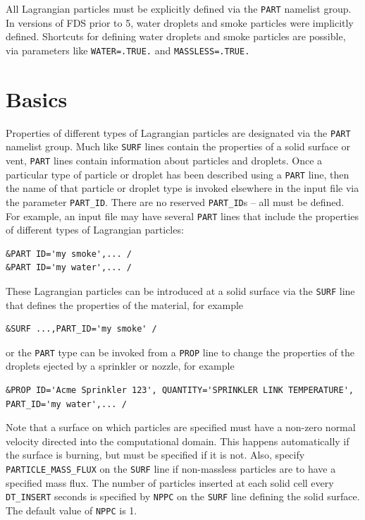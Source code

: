 \documentclass[11pt]{book}
\newcommand{\ct}{\tt\small}
\begin{document}
\begin{warning}
All Lagrangian particles must be explicitly defined via the {\ct PART} namelist group. In versions of FDS prior to 5, water droplets and
smoke particles were implicitly defined. Shortcuts for defining water droplets and smoke particles are possible, via parameters like
{\ct WATER=.TRUE.} and {\ct MASSLESS=.TRUE.}
\end{warning}


\section{Basics}

Properties of different types of
Lagrangian particles are designated via the {\ct PART} namelist group.
Much like {\ct SURF} lines contain the properties of a solid surface or
vent, {\ct PART} lines contain information about particles and droplets.
Once a particular type of particle or droplet has been described using
a {\ct PART} line, then the name of that particle or droplet type is invoked
elsewhere in the input file via the parameter {\ct PART\_ID}. There are no reserved {\ct PART\_ID}s -- all must be defined.
For example, an input file may have several {\ct PART} lines that include the
properties of different types of Lagrangian particles:

\footnotesize
\begin{verbatim}
&PART ID='my smoke',... /
&PART ID='my water',... /
\end{verbatim}
\normalsize
These Lagrangian particles can be introduced at a solid surface via the {\ct SURF} line
that defines the properties of the material, for example

\footnotesize
\begin{verbatim}
&SURF ...,PART_ID='my smoke' /
\end{verbatim}
\normalsize
or the {\ct PART} type can be invoked from a {\ct PROP} line to change
the properties of the droplets ejected by a sprinkler or nozzle, for example

\footnotesize
\begin{verbatim}
&PROP ID='Acme Sprinkler 123', QUANTITY='SPRINKLER LINK TEMPERATURE', PART_ID='my water',... /
\end{verbatim}
\normalsize
Note that a surface on which particles are specified must have a non-zero normal velocity directed into the
computational domain. This happens automatically if the surface is burning, but must be specified
if it is not. Also, specify {\ct PARTICLE\_MASS\_FLUX} on the {\ct SURF} line if non-massless particles
are to have a specified mass flux. The number of particles inserted at each solid cell every
{\ct DT\_INSERT} seconds is specified by {\ct NPPC} on the {\ct SURF} line defining the solid surface. The default
value of {\ct NPPC} is 1.
\end{document}
